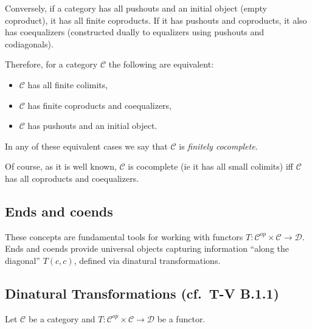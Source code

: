 \documentclass[11pt]{article}
\theoremstyle{definition}
\begin{document}
Conversely, if a category has all pushouts and an initial object (empty coproduct), it has all finite coproducts. If it has pushouts and coproducts, it also has coequalizers (constructed dually to equalizers using pushouts and codiagonals).


Therefore, for a category $\mathcal{C}$ the following are equivalent:
\begin{itemize}
    \item $\mathcal{C}$ has all finite colimits,
    \item $\mathcal{C}$ has finite coproducts and coequalizers,
    \item $\mathcal{C}$ has pushouts and an initial object.
\end{itemize}
In any of these equivalent cases we say that $\mathcal{C}$ is \textit{finitely cocomplete}.

Of course, as it is well known, $\mathcal{C}$ is cocomplete (ie it has all small colimits) iff $\mathcal{C}$  has all coproducts and coequalizers.



\subsection{Ends and coends}

These concepts are fundamental tools for working with functors 
\( T: \mathcal{C}^{op} \times \mathcal{C} \to \mathcal{D} \). 
Ends and coends provide universal objects capturing information 
``along the diagonal'' \( T(c,c) \), defined via dinatural transformations.

\subsection*{Dinatural Transformations (cf.\ T-V B.1.1)}

Let \(\mathcal{C}\) be a category and \( T: \mathcal{C}^{op} \times \mathcal{C} \to \mathcal{D} \) be a functor.
\end{document}
